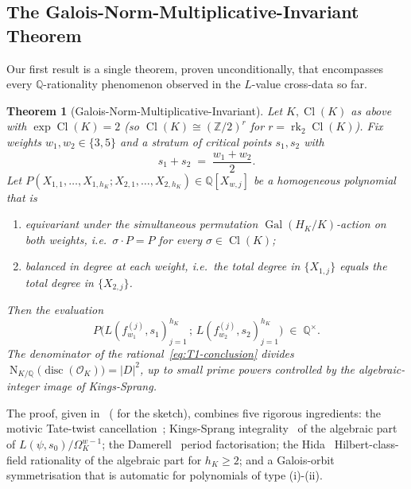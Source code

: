 \documentclass[11pt]{amsart}
\newtheorem{theorem}{Theorem}
\theoremstyle{definition}
\theoremstyle{remark}
\DeclareMathOperator{\Cl}{Cl}
\DeclareMathOperator{\rk}{rk}
\DeclareMathOperator{\Gal}{Gal}
\DeclareMathOperator{\Nm}{N}
\DeclareMathOperator{\disc}{disc}
\newcommand{\Q}{\mathbb{Q}}
\newcommand{\Z}{\mathbb{Z}}
\newcommand{\OK}{\mathcal{O}_K}
\newcommand{\HK}{H_K}
\begin{document}
\subsection{The Galois-Norm-Multiplicative-Invariant Theorem}
\label{ss:T1-statement}

Our first result is a single theorem, proven unconditionally, that
encompasses every $\Q$-rationality phenomenon observed in the
$L$-value cross-data so far.

\begin{theorem}[Galois-Norm-Multiplicative-Invariant]\label{thm:T1}
Let $K, \Cl(K)$ as above with $\exp \Cl(K) = 2$ (so $\Cl(K) \cong
(\Z/2)^r$ for $r = \rk_2 \Cl(K)$). Fix weights $w_1, w_2 \in
\{3, 5\}$ and a stratum of critical points $s_1, s_2$ with
\begin{equation}\label{eq:stratum}
s_1 + s_2 \; = \; \frac{w_1 + w_2}{2}.
\end{equation}
Let $P(X_{1,1}, \dots, X_{1,h_K}; X_{2,1}, \dots, X_{2,h_K}) \in
\Q[X_{w,j}]$ be a homogeneous polynomial that is
\begin{enumerate}
\item[\textup{(i)}] equivariant under the simultaneous permutation
$\Gal(\HK/K)$-action on both weights, i.e.\ $\sigma \cdot P = P$ for
every $\sigma \in \Cl(K)$;
\item[\textup{(ii)}] balanced in degree at each weight, i.e.\ the
total degree in $\{X_{1,j}\}$ equals the total degree in
$\{X_{2,j}\}$.
\end{enumerate}
Then the evaluation
\begin{equation}\label{eq:T1-conclusion}
P\bigl(L(f_{w_1}^{(j)}, s_1)_{j=1}^{h_K}\, ;\,
L(f_{w_2}^{(j)}, s_2)_{j=1}^{h_K}\bigr) \;\in\; \Q^{\times}.
\end{equation}
The denominator of the rational~\eqref{eq:T1-conclusion} divides
$\Nm_{K/\Q}\bigl(\disc(\OK)\bigr) = |D|^2$, up to small prime powers
controlled by the algebraic-integer image of Kings-Sprang.
\end{theorem}

The proof, given in~ ( for the
sketch), combines five rigorous ingredients:
the motivic Tate-twist cancellation~\cite{Deligne1979};
Kings-Sprang integrality~\cite{KingsSprang2025} of the algebraic part
of $L(\psi, s_0)/\Omega_K^{w-1}$;
the Damerell~\cite{Damerell1971} period factorisation;
the Hida~\cite{Hida1981} Hilbert-class-field rationality of the
algebraic part for $h_K \geq 2$; and a Galois-orbit symmetrisation
that is automatic for polynomials of type (i)-(ii).
\end{document}
